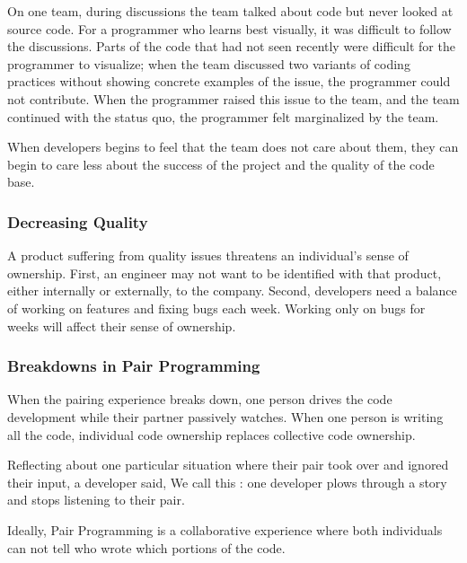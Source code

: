 On one team, during discussions the team talked about code but never looked at source code. 
For a programmer who learns best visually, it was difficult to follow the discussions. Parts of the code that had not seen recently were difficult for the programmer to visualize; when the team discussed two variants of coding practices without showing concrete examples of the issue, the programmer could not contribute. When the programmer raised this issue to the team, and the team continued with the status quo, the programmer felt marginalized by the team.


When developers begins to feel that the team does not care about them, they can begin to care less about the success of the project and the quality of the code base. 

\subsubsection{Decreasing Quality}
A product suffering from quality issues threatens an individual's sense of ownership. First, an engineer may not want to be identified with that product, either internally or externally, to the company. Second, developers need a balance of working on features and fixing bugs each week. Working only on bugs for weeks will affect their sense of ownership.    
 
\subsubsection{Breakdowns in Pair Programming}
When the pairing experience breaks down, one person drives the code development while their partner passively watches. When one person is writing all the code, individual code ownership replaces collective code ownership.  

Reflecting about one particular situation where their pair took over and ignored their input, a developer said,  We call this : one developer plows through a story and stops listening to their pair. 

Ideally, Pair Programming is a collaborative experience where both individuals can not tell who wrote which portions of the code. 

